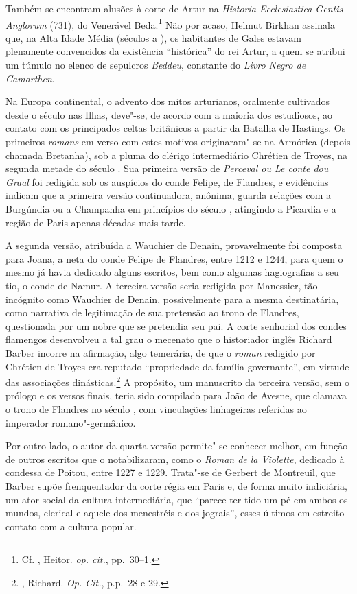 Também se encontram alusões à corte de Artur na \textit{Historia Ecclesiastica
Gentis Anglorum }(731), do Venerável Beda.\footnote{ Cf. , Heitor.
\textit{op. cit.}, pp.~30--1. } Não por acaso, Helmut Birkhan assinala que,
na Alta Idade Média (séculos  a ), os habitantes de Gales estavam
plenamente convencidos da existência “histórica” do rei Artur, a quem se
atribui um túmulo no elenco de sepulcros \textit{Beddeu}, constante do
\textit{Livro Negro de Camarthen}. 

Na Europa continental, o advento dos mitos arturianos, oralmente cultivados
desde o século  nas Ilhas, deve"-se, de acordo com a maioria dos estudiosos,
ao contato com os principados celtas britânicos a partir da Batalha de
Hastings. Os primeiros \textit{romans} em verso com estes motivos originaram"-se
na Armórica (depois chamada Bretanha), sob a pluma do clérigo intermediário
Chrétien de Troyes, na segunda metade do século . Sua primeira versão de
\textit{Perceval ou Le conte dou Graal} foi redigida sob os auspícios do conde
Felipe, de Flandres, e evidências indicam que a primeira versão continuadora,
anônima, guarda relações com a Burgúndia ou a Champanha em princípios do século
, atingindo a Picardia e a região de Paris apenas décadas mais tarde. 

A segunda versão, atribuída a Wauchier de Denain, provavelmente foi composta
para Joana, a neta do conde Felipe de Flandres, entre 1212 e 1244, para quem o
mesmo já havia dedicado alguns escritos, bem como algumas hagiografias a seu
tio, o conde de Namur. A terceira versão seria redigida por Manessier, tão
incógnito como Wauchier de Denain, possivelmente para a mesma destinatária,
como narrativa de legitimação de sua pretensão ao trono de Flandres,
questionada por um nobre que se pretendia seu pai. A corte senhorial dos condes
flamengos desenvolveu a tal grau o mecenato que o historiador inglês Richard Barber incorre na
afirmação, algo temerária, de que o \textit{roman} redigido por Chrétien de
Troyes era reputado “propriedade da família governante”, em virtude das
associações dinásticas.\footnote{ , Richard. \textit{Op. Cit.}, p.p.~28 e 29. } A propósito, um manuscrito da terceira versão, sem o
prólogo e os versos finais, teria sido compilado para João  de Avesne, que
clamava o trono de Flandres no século , com vinculações linhageiras
referidas ao imperador romano"-germânico.

Por outro lado, o autor da quarta versão permite"-se conhecer melhor, em função
de outros escritos que o notabilizaram, como o \textit{Roman de la Violette},
dedicado à condessa de Poitou, entre 1227 e 1229. Trata"-se de Gerbert de
Montreuil, que Barber supõe frenquentador da corte régia em Paris e, de forma
muito indiciária, um ator social da cultura intermediária, que “parece ter tido
um pé em ambos os mundos, clerical e aquele dos menestréis e dos jograis”, esses
últimos em estreito contato com a cultura popular. 

